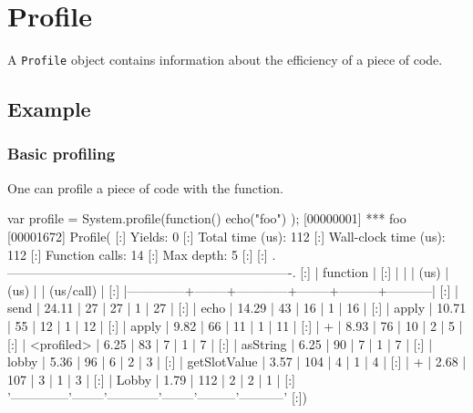 
\section{Profile}

A \lstinline|Profile| object contains information about the efficiency of a
piece of code.

\subsection{Example}

\subsubsection{Basic profiling}

One can profile a piece of code with the  function.

\begin{urbiscript}
var profile = System.profile(function() { echo("foo") });
[00000001] *** foo
[00001672] Profile(
[:]  Yields:                    0
[:]  Total time (us):         112
[:]  Wall-clock time (us):    112
[:]  Function calls:           14
[:]  Max depth:                 5
[:]
[:]  .-------------------------------------------------------------------.
[:]  |   function   |   %
[:]  |              |        |    (us)    |  (us)  |         | (us/call) |
[:]  |--------------+--------+------------+--------+---------+-----------|
[:]  |         send |  24.11 |         27 |     27 |       1 |        27 |
[:]  |         echo |  14.29 |         43 |     16 |       1 |        16 |
[:]  |        apply |  10.71 |         55 |     12 |       1 |        12 |
[:]  |        apply |   9.82 |         66 |     11 |       1 |        11 |
[:]  |            + |   8.93 |         76 |     10 |       2 |         5 |
[:]  |   <profiled> |   6.25 |         83 |      7 |       1 |         7 |
[:]  |     asString |   6.25 |         90 |      7 |       1 |         7 |
[:]  |        lobby |   5.36 |         96 |      6 |       2 |         3 |
[:]  | getSlotValue |   3.57 |        104 |      4 |       1 |         4 |
[:]  |            + |   2.68 |        107 |      3 |       1 |         3 |
[:]  |        Lobby |   1.79 |        112 |      2 |       2 |         1 |
[:]  '--------------'--------'------------'--------'---------'-----------'
[:])
\end{urbiscript}


